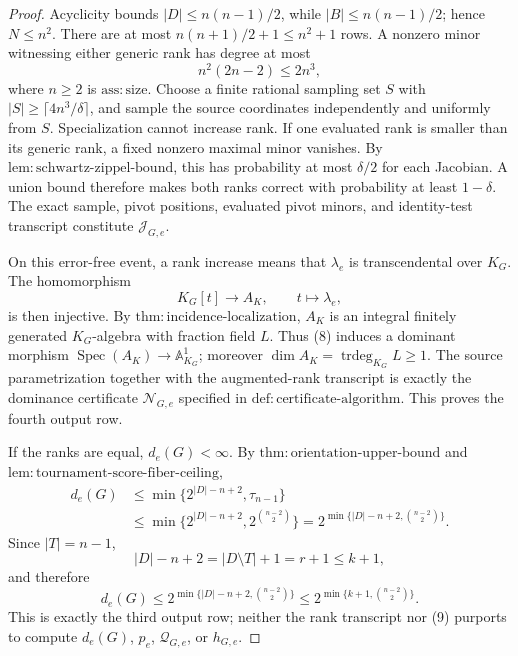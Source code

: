\documentclass{article}
\begin{document}
\begin{proof}
Acyclicity bounds \(|D|\leq n(n-1)/2\), while \(|B|\leq n(n-1)/2\); hence \(N\leq n^2\).  There are at most \(n(n+1)/2+1\leq n^2+1\) rows.  A nonzero minor witnessing either generic rank has degree at most
\[
 n^2(2n-2)\leq2n^3,
\tag{7}
\]
where \(n\geq2\) is \(\mathrm{ass:size}\).  Choose a finite rational sampling set \(S\) with \(|S|\geq\lceil4n^3/\delta\rceil\), and sample the source coordinates independently and uniformly from \(S\).  Specialization cannot increase rank.  If one evaluated rank is smaller than its generic rank, a fixed nonzero maximal minor vanishes.  By \(\mathrm{lem:schwartz\mbox{-}zippel\mbox{-}bound}\), this has probability at most \(\delta/2\) for each Jacobian.  A union bound therefore makes both ranks correct with probability at least \(1-\delta\).  The exact sample, pivot positions, evaluated pivot minors, and identity-test transcript constitute \(\mathcal J_{G,e}\).

On this error-free event, a rank increase means that \(\lambda_e\) is transcendental over \(K_G\).  The homomorphism
\[
 K_G[t]\longrightarrow A_K,\qquad t\longmapsto\lambda_e,
\tag{8}
\]
is then injective.  By \(\mathrm{thm:incidence\mbox{-}localization}\), \(A_K\) is an integral finitely generated \(K_G\)-algebra with fraction field \(L\).  Thus (8) induces a dominant morphism \(\operatorname{Spec}(A_K)\to\mathbb A^1_{K_G}\); moreover \(\dim A_K=\operatorname{trdeg}_{K_G}L\geq1\).  The source parametrization together with the augmented-rank transcript is exactly the dominance certificate \(\mathcal N_{G,e}\) specified in \(\mathrm{def:certificate\mbox{-}algorithm}\).  This proves the fourth output row.

If the ranks are equal, \(d_e(G)<\infty\).  By \(\mathrm{thm:orientation\mbox{-}upper\mbox{-}bound}\) and \(\mathrm{lem:tournament\mbox{-}score\mbox{-}fiber\mbox{-}ceiling}\),
\[
\begin{aligned}
 d_e(G)
 &\leq\min\{2^{|D|-n+2},\tau_{n-1}\}\\
 &\leq\min\{2^{|D|-n+2},2^{\binom{n-2}{2}}\}
 =2^{\min\{|D|-n+2,\binom{n-2}{2}\}}.
\end{aligned}
\tag{9}
\]
Since \(|T|=n-1\),
\[
 |D|-n+2=|D\setminus T|+1=r+1\leq k+1,
\tag{10}
\]
and therefore
\[
 d_e(G)\leq2^{\min\{|D|-n+2,\binom{n-2}{2}\}}
 \leq2^{\min\{k+1,\binom{n-2}{2}\}}.
\tag{11}
\]
This is exactly the third output row; neither the rank transcript nor (9) purports to compute \(d_e(G)\), \(p_e\), \(\mathcal Q_{G,e}\), or \(h_{G,e}\).


\end{proof}
\end{document}

